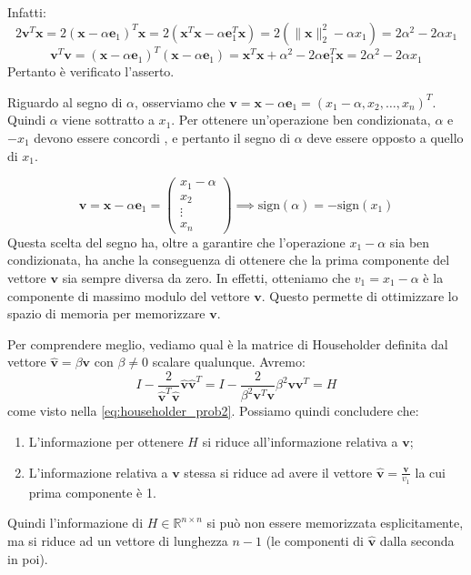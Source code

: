 Infatti:
$$ 2 \mathbf{v}^T \mathbf{x} = 2(\mathbf{x} - \alpha \mathbf{e}_1)^T \mathbf{x} = 2(\mathbf{x}^T \mathbf{x} - \alpha \mathbf{e}_1^T \mathbf{x}) = 2(\|\mathbf{x}\|_2^2 - \alpha x_1) = 2\alpha^2 - 2\alpha x_1 $$
$$ \mathbf{v}^T \mathbf{v} = (\mathbf{x} - \alpha \mathbf{e}_1)^T (\mathbf{x} - \alpha \mathbf{e}_1) = \mathbf{x}^T \mathbf{x} + \alpha^2 - 2\alpha \mathbf{e}_1^T \mathbf{x} = 2\alpha^2 - 2\alpha x_1 $$
Pertanto è verificato l'asserto.

Riguardo al segno di $\alpha$, osserviamo che $\mathbf{v} = \mathbf{x} - \alpha \mathbf{e}_1 = (x_1 - \alpha, x_2, \dots, x_n)^T$.
Quindi $\alpha$ viene sottratto a $x_1$. Per ottenere un'operazione ben condizionata, $\alpha$ e $-x_1$ devono essere concordi , e pertanto il segno di $\alpha$ deve essere opposto a quello di $x_1$.






$$ \mathbf{v} = \mathbf{x} - \alpha \mathbf{e}_1 = \begin{pmatrix} x_1 - \alpha \\ x_2 \\ \vdots \\ x_n \end{pmatrix} \implies \text{sign}(\alpha) = -\text{sign}(x_1) $$
Questa scelta del segno ha, oltre a garantire che l'operazione $x_1 - \alpha$ sia ben condizionata, ha anche la conseguenza di ottenere che la prima componente del vettore $\mathbf{v}$ sia sempre diversa da zero. In effetti, otteniamo che  $v_1 = x_1 - \alpha$ è la componente di massimo modulo del vettore $\mathbf{v}$. 
Questo permette di ottimizzare lo spazio di memoria per memorizzare $\mathbf{v}$.

Per comprendere meglio, vediamo qual è la matrice di Householder definita dal vettore $\hat{\mathbf{v}} = \beta \mathbf{v}$ con $\beta \neq 0$ scalare qualunque.
Avremo:
$$ I - \frac{2}{\hat{\mathbf{v}}^T \hat{\mathbf{v}}} \hat{\mathbf{v}} \hat{\mathbf{v}}^T = I - \frac{2}{\beta^2 \mathbf{v}^T \mathbf{v}} \beta^2 \mathbf{v} \mathbf{v}^T = H $$
come visto nella \eqref{eq:householder_prob2}. Possiamo quindi concludere che:
\begin{enumerate}
    \item L'informazione per ottenere $H$ si riduce all'informazione relativa a $\mathbf{v}$;
    \item L'informazione relativa a $\mathbf{v}$ stessa si riduce ad avere il vettore $\hat{\mathbf{v}} = \frac{\mathbf{v}}{v_1}$ la cui prima componente è 1.
\end{enumerate}
Quindi l'informazione di $H \in \mathbb{R}^{n \times n}$ si può non essere memorizzata esplicitamente, ma si riduce ad un vettore di lunghezza $n-1$ (le componenti di $\hat{\mathbf{v}}$ dalla seconda in poi).

